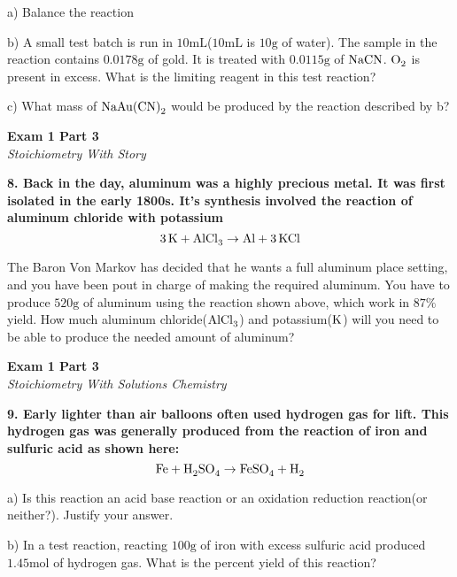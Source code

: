 \documentclass{article}
\begin{document}
    a) Balance the reaction

    b) A small test batch is run in $10 \si{\milli\liter}$($10 \si{\milli\liter}$ is $10 \si{\gram}$ of water). The sample in the reaction contains $0.0178 \si{\gram}$ of gold. It is treated with $0.0115 \si{\gram}$ of $\ce{NaCN}$. $\ce{O_{2}}$ is present in excess. What is the limiting reagent in this test reaction?

    c) What mass of $\ce{NaAu(CN)_{2}}$ would be produced by the reaction described by b?

    \pagebreak

    \begin{center}
        \textbf{Exam 1 Part 3}\\
        \textit{Stoichiometry With Story}
    \end{center}
    \textbf{8. Back in the day, aluminum was a highly precious metal. It was first isolated in the early 1800s. It's synthesis involved the reaction of aluminum chloride with potassium}
    $$ \ce{3K} + \ce{AlCl_{3}} \rightarrow \ce{Al} + \ce{3KCl}$$

    The Baron Von Markov has decided that he wants a full aluminum place setting, and you have been pout in charge of making the required aluminum. You have to produce $520 \si{\gram}$ of aluminum using the reaction shown above, which work in $87\%$ yield. How much aluminum chloride($\ce{AlCl_{3}}$) and potassium($\ce{K}$) will you need to be able to produce the needed amount of aluminum?

    \pagebreak

    \begin{center}
        \textbf{Exam 1 Part 3}\\
        \textit{Stoichiometry With Solutions Chemistry}
    \end{center}
    \textbf{9. Early lighter than air balloons often used hydrogen gas for lift. This hydrogen gas was generally produced from the reaction of iron and sulfuric acid as shown here:}
    $$\ce{Fe} + \ce{H_{2}SO_{4}} \rightarrow \ce{FeSO_{4}} + \ce{H_{2}}$$

    a) Is this reaction an acid base reaction or an oxidation reduction reaction(or neither?). Justify your answer.

    b) In a test reaction, reacting $100 \si{\gram}$ of iron with excess sulfuric acid produced $1.45 \si{\mole}$ of hydrogen gas. What is the percent yield of this reaction?
\end{document}
